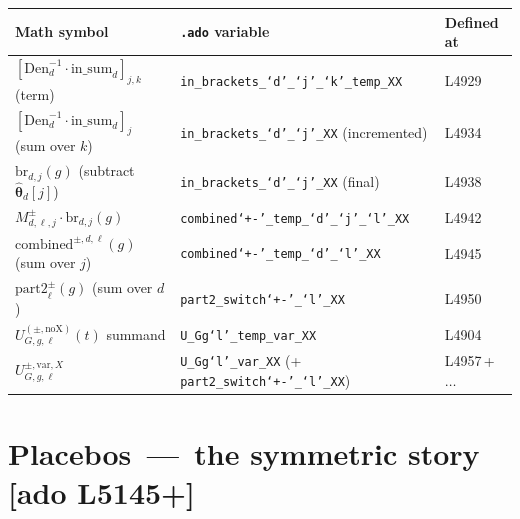 \documentclass[11pt]{article}
\newcommand{\code}[1]{\texttt{\small #1}}
\newcommand{\Adoref}[1]{\textcolor{accent}{\footnotesize\textbf{[ado L#1]}}}
\newcommand{\1}{\mathbb{1}}
\newcommand{\thetad}{\widehat{\bm{\theta}}_d}
\begin{document}
\noindent\begin{tabular}{@{}lll@{}}
\toprule
Math symbol & \texttt{.ado} variable & Defined at \\
\midrule
$[\mathrm{Den}_d^{-1}\cdot \mathrm{in\_sum}_d]_{j,k}$ (term)  & \code{in\_brackets\_`d'\_`j'\_`k'\_temp\_XX} & L4929 \\
$[\mathrm{Den}_d^{-1}\cdot \mathrm{in\_sum}_d]_{j}$ (sum over $k$) & \code{in\_brackets\_`d'\_`j'\_XX} (incremented) & L4934 \\
$\mathrm{br}_{d,j}(g)$ (subtract $\thetad[j]$) & \code{in\_brackets\_`d'\_`j'\_XX} (final) & L4938 \\
$M^{\pm}_{d,\ell,j}\cdot \mathrm{br}_{d,j}(g)$ & \code{combined`+\!-'\_temp\_`d'\_`j'\_`l'\_XX} & L4942 \\
$\mathrm{combined}^{\pm,d,\ell}(g)$ (sum over $j$) & \code{combined`+\!-'\_temp\_`d'\_`l'\_XX} & L4945 \\
$\mathrm{part2}^{\pm}_{\ell}(g)$ (sum over $d$) & \code{part2\_switch`+\!-'\_`l'\_XX} & L4950 \\
$U^{(\pm,\mathrm{noX})}_{G,g,\ell}(t)$ summand & \code{U\_Gg`l'\_temp\_var\_XX} & L4904 \\
$U^{\pm,\mathrm{var},X}_{G,g,\ell}$ & \code{U\_Gg`l'\_var\_XX} (+ \code{part2\_switch`+\!-'\_`l'\_XX}) & L4957\,+\,$\dots$ \\
\bottomrule
\end{tabular}

\section[Placebos -- the symmetric story (L5145+)]{Placebos \,---\, the symmetric story \Adoref{5145+}}
\end{document}
